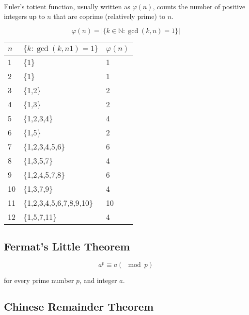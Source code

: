 \documentclass[11pt]{article}
\theoremstyle{plain}
\theoremstyle{definition}
\begin{document}
Euler's totient function, usually written as $\varphi(n)$, counts the number of positive integers up to $n$ that are coprime (relatively prime) to $n$.

$$ \varphi(n) = |\{k \in \mathbb{N} : \gcd(k, n) = 1\}| $$

\begin{center}
  \begin{tabular}{l l l}
    $n$ & $\{k : \gcd(k, n1) = 1\}$ & $\varphi(n)$ \\
    \hline
    1  & \{1\}                    & 1 \\
    2  & \{1\}                    & 1 \\
    3  & \{1,2\}                  & 2 \\
    4  & \{1,3\}                  & 2 \\
    5  & \{1,2,3,4\}              & 4 \\
    6  & \{1,5\}                  & 2 \\
    7  & \{1,2,3,4,5,6\}          & 6 \\
    8  & \{1,3,5,7\}              & 4 \\
    9  & \{1,2,4,5,7,8\}          & 6 \\
    10 & \{1,3,7,9\}              & 4 \\
    11 & \{1,2,3,4,5,6,7,8,9,10\} & 10 \\
    12 & \{1,5,7,11\}             & 4 \\
  \end{tabular}
\end{center}

\subsection*{Fermat's Little Theorem}

$$
a^p \equiv a (\mod p)
$$

for every prime number $p$, and integer $a$.

\subsection*{Chinese Remainder Theorem}
\end{document}
